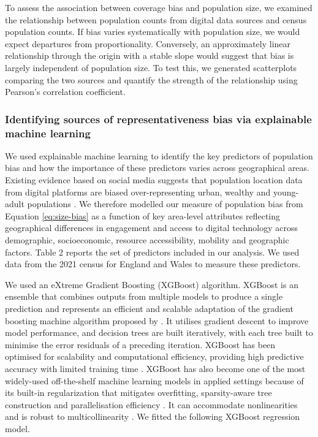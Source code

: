 \documentclass[]{rsos}%
\begin{document}
To assess the association between coverage bias and population size, we
examined the relationship between population counts from digital data
sources and census population counts. If bias varies systematically with
population size, we would expect departures from proportionality.
Conversely, an approximately linear relationship through the origin with
a stable slope would suggest that bias is largely independent of
population size. To test this, we generated scatterplots comparing the
two sources and quantify the strength of the relationship using
Pearson's correlation coefficient.

\subsubsection{Identifying sources of representativeness bias via explainable machine learning}\label{sec-eml}

We used explainable machine learning to identify the key predictors of
population bias and how the importance of these predictors varies across
geographical areas. Existing evidence based on social media suggests
that population location data from digital platforms are biased
over-representing urban, wealthy and young-adult populations \citep{blumenstock2010, wesolowski13-biases, schlosser21-biases}.
We therefore modelled our measure of population bias from
Equation \ref{eq:size-bias} as a function of key area-level attributes
reflecting geographical differences in engagement and access to digital
technology across demographic, socioeconomic, resource accessibility,
mobility and geographic factors. Table 2 reports the set of predictors
included in our analysis. We used data from the 2021 census for England
and Wales to measure these predictors.

We used an eXtreme Gradient Boosting (XGBoost) algorithm. XGBoost is an
ensemble that combines outputs from multiple models to produce a single
prediction and represents an efficient and scalable adaptation of the
gradient boosting machine algorithm proposed by \citep{friedman2001a}. It
utilises gradient descent to improve model performance, and decision
trees are built iteratively, with each tree built to minimise the error
residuals of a preceding iteration. XGBoost has been optimised for
scalability and computational efficiency, providing high predictive
accuracy with limited training time \citep{chen2016, nielsen2016tree}.
XGBoost has also become one of the most widely-used off-the-shelf
machine learning models in applied settings because of its built-in
regularization that mitigates overfitting, sparsity-aware tree
construction and parallelisation efficiency \citep{chen2016}. It can
accommodate nonlinearities and is robust to multicollinearity
\citep{chen2016}. We fitted the following XGBoost regression model.
\end{document}
